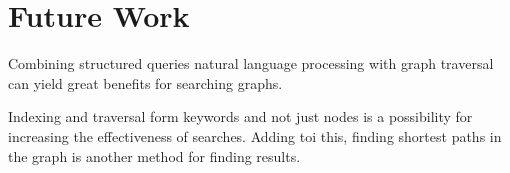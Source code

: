 \section{Future Work}
\label{sec:futureWork}
Combining structured queries natural language processing with graph traversal can yield great benefits for searching graphs. 

Indexing and traversal form keywords and not just nodes is a possibility for increasing the effectiveness of searches. Adding toi this, finding shortest paths in the graph is another method for finding results.
